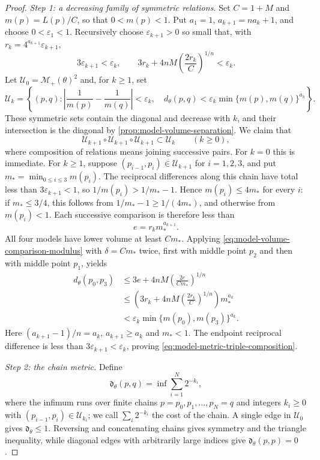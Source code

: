 \begin{proof}
\emph{Step 1: a decreasing family of symmetric relations.} Set $C=1+M$ and $m(p)=L(p)/C$, so that $0<m(p)<1$. Put $a_1=1$, $a_{k+1}=na_k+1$, and choose $0<\varepsilon_1<1$. Recursively choose $\varepsilon_{k+1}>0$ so small that, with $r_k=4^{a_{k+1}}\varepsilon_{k+1}$,
\[
 3\varepsilon_{k+1}<\varepsilon_k,\qquad
 3r_k+4nM\left(\frac{2r_k}{C}\right)^{1/n}<\varepsilon_k.
\]
Let $\mathcal U_0=\mathcal M_+(\theta)^2$ and, for $k\geq1$, set
\[
 \mathcal U_k=\left\{(p,q):
 \left|\frac1{m(p)}-\frac1{m(q)}\right|<\varepsilon_k,
 \quad d_\theta(p,q)<\varepsilon_k\min\{m(p),m(q)\}^{a_k}\right\}.
\]
These symmetric sets contain the diagonal and decrease with $k$, and their intersection is the diagonal by \cref{prop:model-volume-separation}. We claim that
\begin{equation}\label{eq:model-metric-triple-composition}
 \mathcal U_{k+1}\circ\mathcal U_{k+1}\circ\mathcal U_{k+1}
 \subset\mathcal U_k\qquad(k\geq0),
\end{equation}
where composition of relations means joining successive pairs. For $k=0$ this is immediate. For $k\geq1$, suppose $(p_{i-1},p_i)\in\mathcal U_{k+1}$ for $i=1,2,3$, and put $m_*=\min_{0\leq i\leq3}m(p_i)$. The reciprocal differences along this chain have total less than $3\varepsilon_{k+1}<1$, so $1/m(p_i)>1/m_*-1$. Hence $m(p_i)\leq4m_*$ for every $i$: if $m_*\leq3/4$, this follows from $1/m_*-1\geq1/(4m_*)$, and otherwise from $m(p_i)<1$. Each successive comparison is therefore less than
\[
 e=r_k m_*^{a_{k+1}}.
\]
All four models have lower volume at least $Cm_*$. Applying \eqref{eq:model-volume-comparison-modulus} with $\delta=Cm_*$ twice, first with middle point $p_2$ and then with middle point $p_1$, yields
\[
 \begin{split}
 d_\theta(p_0,p_3)
 &\leq3e+4nM\left(\frac{2e}{Cm_*}\right)^{1/n}\\
 &\leq\left(3r_k+4nM\left(\frac{2r_k}{C}\right)^{1/n}\right)m_*^{a_k}\\
 &<\varepsilon_k\min\{m(p_0),m(p_3)\}^{a_k}.
 \end{split}
\]
Here $(a_{k+1}-1)/n=a_k$, $a_{k+1}\geq a_k$ and $m_*<1$. The endpoint reciprocal difference is less than $3\varepsilon_{k+1}<\varepsilon_k$, proving \eqref{eq:model-metric-triple-composition}.

\emph{Step 2: the chain metric.} Define
\begin{equation}\label{eq:positive-model-chain-metric}
 \mathfrak d_\theta(p,q)=\inf\sum_{i=1}^N2^{-k_i},
\end{equation}
where the infimum runs over finite chains $p=p_0,p_1,\ldots,p_N=q$ and integers $k_i\geq0$ with $(p_{i-1},p_i)\in\mathcal U_{k_i}$; we call $\sum_i2^{-k_i}$ the cost of the chain. A single edge in $\mathcal U_0$ gives $\mathfrak d_\theta\leq1$. Reversing and concatenating chains gives symmetry and the triangle inequality, while diagonal edges with arbitrarily large indices give $\mathfrak d_\theta(p,p)=0$.


\end{proof}
